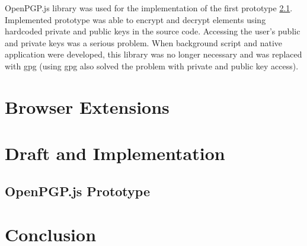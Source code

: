 OpenPGP.js library was used for the implementation of the first prototype \ref{prototype:OpenPGPjs}. Implemented prototype was able to encrypt and decrypt elements using hardcoded private and public keys in the source code. Accessing the user's public and private keys was a serious problem.  When background script and native application were developed, this library was no longer necessary and was replaced with gpg (using gpg also solved the problem with private and public key access).

\chapter{Browser Extensions}

\chapter{Draft and Implementation}

\section{OpenPGP.js Prototype}
\label{prototype:OpenPGPjs}


\chapter{Conclusion}
